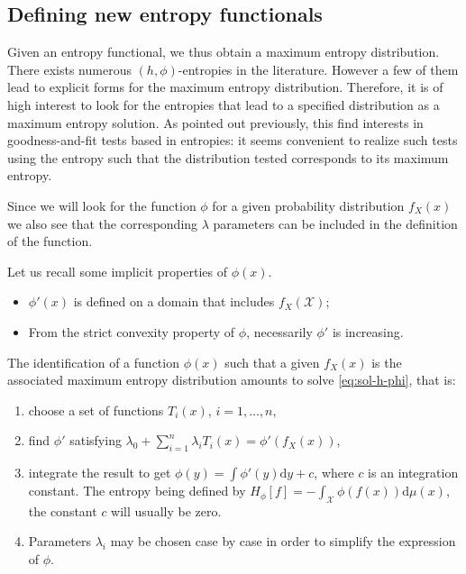 \documentclass[english,onecolumn]{elsarticle}
\def\d{\mathrm{d}}
\def\dmu{\mathrm{d}\mu}
\def\X{\mathcal{X}}
\begin{document}
\subsection{Defining new entropy functionals}
\label{subsec:NewPhiEnt}

Given  an entropy  functional, we  thus obtain  a maximum  entropy distribution.
There exists numerous  $(h,\phi)$-entropies in the literature. However  a few of
them lead to explicit forms for the maximum entropy distribution.  Therefore, it
is  of  high interest  to  look  for the  entropies  that  lead  to a  specified
distribution as a maximum entropy solution. As pointed out previously, this find
interests in goodness-and-fit  tests based in entropies: it  seems convenient to
realize  such  tests  using  the  entropy  such  that  the  distribution  tested
corresponds to its maximum entropy.

Since we will look for the  function $\phi$ for a given probability distribution
$f_X(x)$ we also see that the corresponding $\lambda$ parameters can be included
in the definition of the function.

Let us recall some implicit properties of $\phi(x)$.
%
\begin{itemize}
\item $\phi'(x)$ is defined on a domain that includes $f_X(\X)$;
%
\item  From the  strict convexity  property  of $\phi$,  necessarily $\phi'$  is
  increasing.
\end{itemize}
%
The identification  of a function  $\phi(x)$ such that  a given $f_X(x)$  is the
associated maximum  entropy distribution amounts  to solve \eqref{eq:sol-h-phi},
that is:
%
\begin{enumerate}
\item choose a set of functions $T_i(x)$, $i = 1, \ldots, n$,
%
\item find $\phi'$ satisfying  $\displaystyle \lambda_0 + \sum_{i=1}^n \lambda_i
  T_i(x) = \phi'(f_X(x))$,
%
\item integrate the result to get  $\displaystyle \phi(y) = \int \phi'(y) \d y +
  c$,  where $c$  is  an integration  constant.   The entropy  being defined  by
  $\displaystyle  H_\phi[f] = -  \int_\X \phi(f(x))  \dmu(x)$, the  constant $c$
  will usually be zero.
% 
\item Parameters  $\lambda_i$ may be chosen  case by case in  order to simplify
  the expression of $\phi$.
\end{enumerate}
\end{document}
